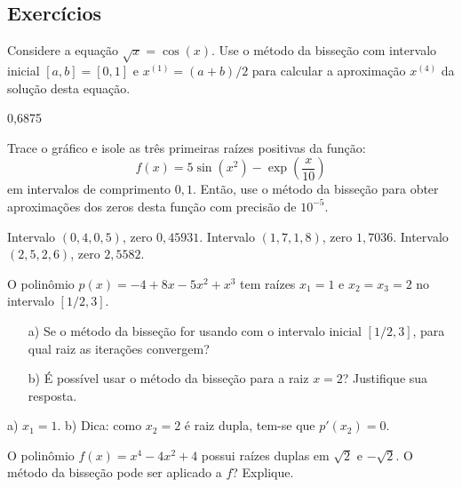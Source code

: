 \begin{ex}


\subsection*{Exercícios}

\begin{exer}Considere a equação $\sqrt{x}=\cos(x)$. Use o método da bisseção com intervalo inicial $[a, b] = [0, 1]$ e $x^{(1)} = (a+b)/2$ para calcular a aproximação $x^{(4)}$ da solução desta equação.
\end{exer}
\begin{resp}
  0,6875
\end{resp}

\begin{exer} Trace o gráfico e isole as três primeiras raízes positivas da função:
  \begin{equation}
    f(x)=5\sin(x^2)-\exp\left({\frac{x}{10}}\right)
  \end{equation}
em intervalos de comprimento $0,1$. Então, use o método da bisseção para obter aproximações dos zeros desta função com precisão de $10^{-5}$.
\end{exer}
\begin{resp}
  Intervalo $(0,4, 0,5)$, zero $0,45931$. Intervalo $(1,7, 1,8)$, zero $1,7036$. Intervalo $(2,5, 2,6)$, zero $2,5582$.
\end{resp}

\begin{exer}\label{exer:raizes_multiplas}
  O polinômio $p(x) = -4 + 8x - 5x^2 + x^3$ tem raízes $x_1=1$ e $x_2=x_3=2$ no intervalo $[1/2, 3]$.
  \begin{itemize}
  \item[a)] Se o método da bisseção for usando com o intervalo inicial $[1/2, 3]$, para qual raiz as iterações convergem?
  \item[b)] É possível usar o método da bisseção para a raiz $x=2$? Justifique sua resposta.
  \end{itemize}
\end{exer}
\begin{resp}
  a) $x_1=1$. b) Dica: como $x_2=2$ é raiz dupla, tem-se que $p'(x_2) = 0$.
\end{resp}

\begin{exer}\label{prob_raiz_dupla} O polinômio $f(x)=x^4-4x^2+4$ possui raízes duplas em $\sqrt{2}$ e $-\sqrt{2}$. O método da bisseção pode ser aplicado a $f$? Explique.
\end{exer}



\end{ex}
